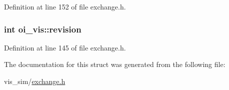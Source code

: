 Definition at line 152 of file exchange.h.

\hypertarget{structoi__vis_a2c32fac61ef27632bc82f0e4a19948ce}{
\subsubsection[{revision}]{\setlength{\rightskip}{0pt plus 5cm}int {\bf oi\_\-vis::revision}}}
\label{structoi__vis_a2c32fac61ef27632bc82f0e4a19948ce}


Definition at line 145 of file exchange.h.



The documentation for this struct was generated from the following file:\begin{DoxyCompactItemize}
\item 
vis\_\-sim/\hyperlink{exchange_8h}{exchange.h}\end{DoxyCompactItemize}
